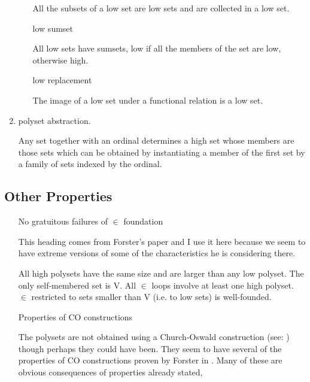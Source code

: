 \documentclass[numreferences]{rbjk}
\begin{document}
\begin{article}
\begin{enumerate}
\begin{itemize}
All the subsets of a low set are low sets and are collected in a low set.

\item [low sumset]\ 

All low sets have sumsets, low if all the members of the set are low, otherwise high.

\item [low replacement]\ 

The image of a low set under a functional relation is a low set.

\end{itemize}

\item polyset abstraction.

Any set together with an ordinal determines a high set whose members are those sets which can be obtained by instantiating a member of the first set by a family of sets indexed by the ordinal.

\end{enumerate}

\subsection{Other Properties}

\begin{itemize}

\item[No gratuitous failures of $\in$ foundation]\ 

This heading comes from Forster's paper \cite{forster2006} and I use it here because we seem to have extreme versions of some of the characteristics he is considering there.

All high polysets have the same size and are larger than any low polyset.
The only self-membered set is V.
All $\in$ loops involve at least one high polyset.
$\in$ restricted to sets smaller than V (i.e. to low sets) is well-founded.

\item[Properties of CO constructions]\ 

The polysets are not obtained using a Church-Oswald construction (see: \cite{forster2005}) though perhaps they could have been.
They seem to have several of the properties of CO constructions proven by Forster in \cite{forster2005}.
Many of these are obvious consequences of properties already stated,

\begin{itemize}


\end{itemize}
\end{itemize}
\end{article}
\end{document}
